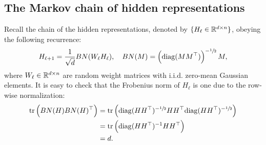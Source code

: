  \subsection*{The Markov chain of hidden representations} Recall the chain of the hidden representations, denoted by $\{ H_\ell\in \mathbb{R}^{d\times n} \}$, obeying the following recurrence: 
 \begin{align} \label{ortho:eq:BNrecurrence_app}
     H_{\ell+1} = \frac{1}{\sqrt{d}}
     BN(W_\ell H_\ell), \quad BN(M) = \left(\mathrm{diag}(M M^\top)\right)^{-\sfrac{1}{2}}M,
 \end{align}
 where $W_\ell \in \mathbb{R}^{d\times n}$ are random weight matrices with i.i.d. zero-mean Gaussian elements. It is easy to check that the Frobenius norm of $H_\ell$ is one due to the row-wise normalization: 
 \begin{equation}
  \label{ortho:eq:unitnorm_app}   
 \begin{aligned} 
    \mathrm{tr} \left(  BN(H) BN(H)^\top \right) & = \mathrm{tr}\left( \mathrm{diag}(H H^\top)^{-\sfrac{1}{2}} H H^\top\mathrm{diag}(H H^\top)^{-\sfrac{1}{2}}\right) \\ 
    & = \mathrm{tr}\left( \mathrm{diag}(H H^\top)^{-1} H H^\top\right) \\ 
    & = d.
 \end{aligned}
 \end{equation}
